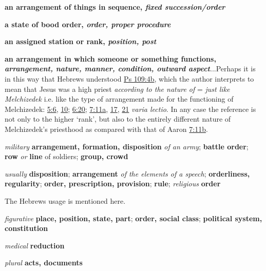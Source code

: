 				\begin{compactdesc}
				
					\item[BDAG 879a] \phantom{.}
						\begin{compactitem}
							\item[1] \textbf{an arrangement of things in sequence, \textit{fixed succession/order}}
							\item[2] \textbf{a state of bood order, \textit{order, proper procedure}}
							\item[3] \textbf{an assigned station or rank, \textit{position, post}}
							\item[4] \textbf{an arrangement in which someone or something functions, \textit{arrangement, nature, manner, condition, outward aspect}}...Perhaps it is in this way that Hebrews understood \hyperref[PSALMS-110-4]{Ps 109:4b}, which the author interprets to mean that Jesus was a high priest  \textit{according to the nature of} = \textit{just like Melchizedek} i.e. like the type of arrangement made for the functioning of Melchizedek: \hyperref[HEBREWS-5-6]{5:6}, \hyperref[HEBREWS-5-10]{10}; \hyperref[HEBREWS-6-20]{6:20}; \hyperref[HEBREWS-7-11]{7:11a}, \hyperref[HEBREWS-7-17]{17}, \hyperref[HEBREWS-7-21]{21} \textit{varia lectio}. In any case the reference is not only to the higher `rank', but also to the entirely different nature of Melchizedek's priesthood as compared with that of Aaron \hyperref[HEBREWS-7-11]{7:11b}.
						\end{compactitem}
						
					\item[Brill 2082b, PDF 2146] \phantom{.}
						\begin{compactitem}
							\item[A] \textit{military} \textbf{arrangement, formation, disposition} \textit{of an army}; \textbf{battle order}; \textbf{row} \textit{or} \textbf{line} of soldiers; \textbf{group, crowd}
							\item[B] \textit{usually} \textbf{disposition}; \textbf{arrangement} \textit{of the elements of a speech}; \textbf{orderliness, regularity}; \textbf{order, prescription, provision}; \textbf{rule}; \textit{religious} \textbf{order}
								\begin{compactitem}
									\item The Hebrews usage is mentioned here.
								\end{compactitem}
							\item[C] \textit{figurative} \textbf{place, position, state, part}; \textbf{order, social class}; \textbf{political system, constitution}
							\item[D] \textit{medical} \textbf{reduction}
							\item[E] \textit{plural} \textbf{acts, documents}
						\end{compactitem}
						

\end{compactdesc}
